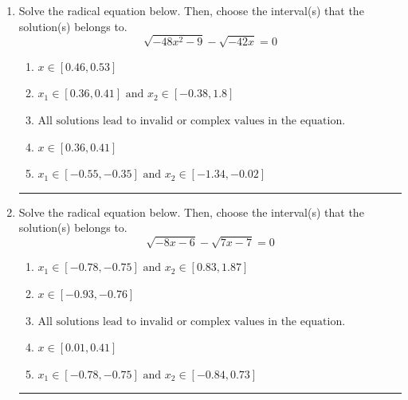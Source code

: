 \documentclass[14pt]{extbook}
\newcommand{\litem}[1]{\item#1\hspace*{-1cm}\rule{\textwidth}{0.4pt}}
\begin{document}
\begin{enumerate}
{\begin{enumerate}[label=\Alph*.]
\end{enumerate} }
\litem{
Solve the radical equation below. Then, choose the interval(s) that the solution(s) belongs to.\[ \sqrt{-48 x^2 - 9} - \sqrt{-42 x} = 0 \]\begin{enumerate}[label=\Alph*.]
\item \( x \in [0.46,0.53] \)
\item \( x_1 \in [0.36, 0.41] \text{ and } x_2 \in [-0.38,1.8] \)
\item \( \text{All solutions lead to invalid or complex values in the equation.} \)
\item \( x \in [0.36,0.41] \)
\item \( x_1 \in [-0.55, -0.35] \text{ and } x_2 \in [-1.34,-0.02] \)

\end{enumerate} }
\litem{
Solve the radical equation below. Then, choose the interval(s) that the solution(s) belongs to.\[ \sqrt{-8 x - 6} - \sqrt{7 x - 7} = 0 \]\begin{enumerate}[label=\Alph*.]
\item \( x_1 \in [-0.78, -0.75] \text{ and } x_2 \in [0.83,1.87] \)
\item \( x \in [-0.93,-0.76] \)
\item \( \text{All solutions lead to invalid or complex values in the equation.} \)
\item \( x \in [0.01,0.41] \)
\item \( x_1 \in [-0.78, -0.75] \text{ and } x_2 \in [-0.84,0.73] \)


\end{enumerate}}
\end{enumerate}
\end{document}
